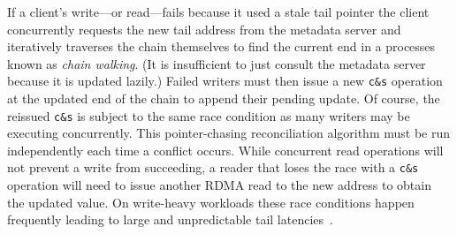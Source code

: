 If a client's write---or read---fails because it used a stale tail pointer
the client concurrently requests the new tail address from the metadata
server and iteratively traverses the chain themselves to find the current end
in a processes known as \emph{chain walking}. (It is insufficient to just
consult the metadata server because it is updated lazily.) Failed writers
must then issue a new \texttt{c\&s} operation at the updated end of the chain to
append their pending update. Of course, the reissued \texttt{c\&s} is subject to the
same race condition as many writers may be executing concurrently. This
pointer-chasing reconciliation algorithm must be run independently each time
a conflict occurs.
While concurrent read operations will not prevent a write from succeeding, a
reader that loses the race with a \texttt{c\&s} operation will need to issue another
RDMA read to the new address to obtain the updated value. On write-heavy
workloads these race conditions happen frequently
leading to large and unpredictable tail latencies~\cite[Table 2]{clover}.








